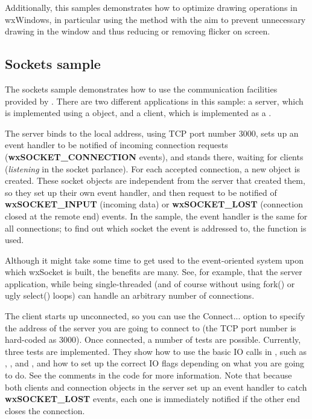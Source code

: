 Additionally, this samples demonstrates how to optimize drawing operations in wxWindows,
in particular using the  method with 
the aim to prevent unnecessary drawing in the window and thus reducing or removing 
flicker on screen.


\subsection{Sockets sample}\label{samplesockets}

The sockets sample demonstrates how to use the communication facilities
provided by . There are two different
applications in this sample: a server, which is implemented using a 
 object, and a client, which
is implemented as a .

The server binds to the local address, using TCP port number 3000,
sets up an event handler to be notified of incoming connection requests
({\bf wxSOCKET\_CONNECTION} events), and stands there, waiting for clients
({\it listening} in the socket parlance). For each accepted connection,
a new  object is created. These
socket objects are independent from the server that created them, so
they set up their own event handler, and then request to be notified
of {\bf wxSOCKET\_INPUT} (incoming data) or {\bf wxSOCKET\_LOST} 
(connection closed at the remote end) events. In the sample, the event
handler is the same for all connections; to find out which socket the
event is addressed to, the  function
is used.

Although it might take some time to get used to the event-oriented
system upon which wxSocket is built, the benefits are many. See, for
example, that the server application, while being single-threaded
(and of course without using fork() or ugly select() loops) can handle
an arbitrary number of connections.

The client starts up unconnected, so you can use the Connect... option
to specify the address of the server you are going to connect to (the
TCP port number is hard-coded as 3000). Once connected, a number of
tests are possible. Currently, three tests are implemented. They show
how to use the basic IO calls in ,
such as , , 
 and ,
and how to set up the correct IO flags depending on what you are going to
do. See the comments in the code for more information. Note that because
both clients and connection objects in the server set up an event handler
to catch {\bf wxSOCKET\_LOST} events, each one is immediately notified
if the other end closes the connection.

